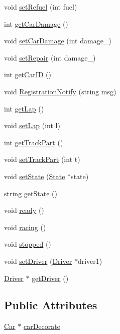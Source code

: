 \begin{DoxyCompactItemize}
\item 
void \mbox{\hyperlink{class_car_a57adfd20b916e5b22c7d4fb5989f671e}{set\+Refuel}} (int fuel)
\item 
int \mbox{\hyperlink{class_car_a949327d4945b878e9e34e92979b9e589}{get\+Car\+Damage}} ()
\item 
void \mbox{\hyperlink{class_car_a0b440c163057149751f81da6f50882f3}{set\+Car\+Damage}} (int damage\+\_\+)
\item 
void \mbox{\hyperlink{class_car_a5ee7015f3f094416513a718cd38b0a10}{set\+Repair}} (int damage\+\_\+)
\item 
int \mbox{\hyperlink{class_car_af47c8e6bb7bd54dc0f027b268916fc5c}{get\+Car\+ID}} ()
\item 
void \mbox{\hyperlink{class_car_ab8e5fb187d9677c43f65a908f917baa8}{Registration\+Notify}} (string msg)
\item 
int \mbox{\hyperlink{class_car_abfcccd0fa3ef14dea58d1a92b9caf62a}{get\+Lap}} ()
\item 
void \mbox{\hyperlink{class_car_ae74720b1f4ca277faa844b6db17c0a30}{set\+Lap}} (int l)
\item 
int \mbox{\hyperlink{class_car_abecf0c28ecabc7f74bd40a3504da3a3a}{get\+Track\+Part}} ()
\item 
void \mbox{\hyperlink{class_car_abc826195aea1df1ad8c2f406a8b28721}{set\+Track\+Part}} (int t)
\item 
void \mbox{\hyperlink{class_car_a624d9dc67aae36f0e3cdadb471d4bba6}{set\+State}} (\mbox{\hyperlink{class_state}{State}} $\ast$state)
\item 
string \mbox{\hyperlink{class_car_a6b436cfadb57e26266ef2d2875619b77}{get\+State}} ()
\item 
void \mbox{\hyperlink{class_car_aa698269ee1300d5844decbe894c139c5}{ready}} ()
\item 
void \mbox{\hyperlink{class_car_a944100a25b1f6c67ca95e45868d9c10b}{racing}} ()
\item 
void \mbox{\hyperlink{class_car_a5e1e788c983d40dfe465f0a536d58d47}{stopped}} ()
\item 
void \mbox{\hyperlink{class_car_a9da54533fe2d029ab4300d1b8682c69f}{set\+Driver}} (\mbox{\hyperlink{class_driver}{Driver}} $\ast$driver1)
\item 
\mbox{\hyperlink{class_driver}{Driver}} $\ast$ \mbox{\hyperlink{class_car_a42b06291391327a61a56ca69dd9951b5}{get\+Driver}} ()
\end{DoxyCompactItemize}
\subsection*{Public Attributes}
\begin{DoxyCompactItemize}
\item 
\mbox{\hyperlink{class_car}{Car}} $\ast$ \mbox{\hyperlink{class_car_aceffd197450d95f4c6a15e38152b50a4}{car\+Decorate}}
\end{DoxyCompactItemize}


